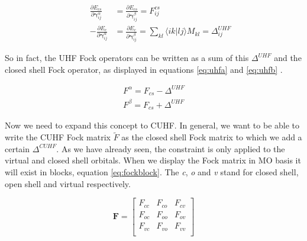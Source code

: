 \begin{subequations}
  \begin{align}
    \label{eq:der1}
     &  & \frac{\partial E_{cs}}{\partial \mathbf{\gamma}^\alpha_{ij}} & = \frac{\partial E_{cs}}{\partial \mathbf{\gamma}^\beta_{ij}} = F^{cs}_{ij}                                             \\
    \label{eq:der2}
     &  & -\frac{\partial E_c}{\partial \mathbf{\gamma}^\alpha_{ij}}   & = \frac{\partial E_c}{\partial \mathbf{\gamma}^\beta_{ij}} = \sum_{kl} \langle ik|lj \rangle M_{kl} = \Delta^{UHF}_{ij}
  \end{align}
\end{subequations}

So in fact, the UHF Fock operators can be written as a sum of this $\Delta^{UHF}$ and the closed shell Fock operator, as displayed in equations \eqref{eq:uhfa} and \eqref{eq:uhfb}
 \cite{Scuseria2010}.

\begin{subequations}
  \begin{align}
    \label{eq:uhfa}
    F^\alpha = F_{cs} - \Delta^{UHF} \\
    \label{eq:uhfb}
    F^\beta = F_{cs} + \Delta^{UHF}
  \end{align}
\end{subequations}

Now we need to expand this concept to CUHF. In general, we want
to be able to write the CUHF Fock matrix $\tilde{F}$ as the closed shell Fock matrix to which we add a certain $\Delta^{CUHF}$. As we have already seen, the constraint is only
applied to the virtual and closed shell orbitals. When we display the Fock matrix in MO basis it will exist in blocks, equation \eqref{eq:fockblock}. The \textit{c}, \textit{o} and \textit{v}
stand for closed shell, open shell and virtual respectively.

\begin{equation}\label{eq:fockblock}
  \mathbf{F} = \begin{bmatrix}
    F_{cc} & F_{co} & F_{cv} \\
    F_{oc} & F_{oo} & F_{ov} \\
    F_{vc} & F_{vo} & F_{vv} \\
  \end{bmatrix}
\end{equation}

